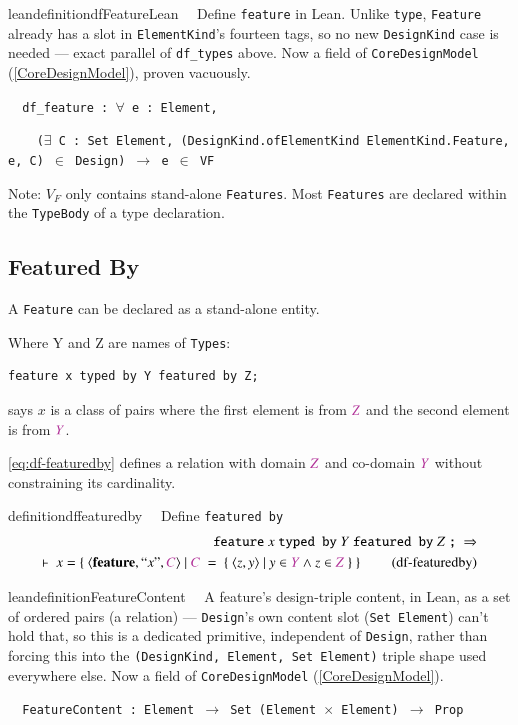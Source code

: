 \begin{restatable}{leandefinition}{dfFeatureLean}~~ Define \texttt{feature} in Lean. Unlike
\texttt{type}, \texttt{Feature} already has a slot in \texttt{ElementKind}'s fourteen tags, so no new
\texttt{DesignKind} case is needed --- exact parallel of \texttt{df\_types} above. Now a field of
\texttt{CoreDesignModel} (\ref{CoreDesignModel}), proven vacuously.

\texttt{~~df\_feature : $\forall$ e : Element,}

\texttt{~~~~($\exists$ C : Set Element, (DesignKind.ofElementKind ElementKind.Feature, e, C) $\in$ Design) $\to$ e $\in$ VF}
\label{df_feature}
\end{restatable}

Note:  $V_F$ only contains stand-alone  \texttt{Features}.  Most  \texttt{Features} are declared within the \texttt{TypeBody} of a type declaration.

\subsection{Featured By}  

\pn A \texttt{Feature} can be declared as a stand-alone entity.

\pn Where Y and Z are names of \texttt{Types}:
\begin{lstlisting}
feature x typed by Y featured by Z;
\end{lstlisting}
says $x$ is a class of pairs where the first element is from $\mc{Z}$ and the second element is from $\mc{Y}$.

\ref{eq:df-featuredby} defines a relation with domain $\mc{Z}$ and co-domain $\mc{Y}$ without constraining its cardinality.


\begin{restatable}{definition}{dffeaturedby}~~   Define \texttt{featured by}
\begin{align}
\texttt{feature}~x~\texttt{typed by}~ Y ~\texttt{featured by}~ Z~\texttt{;}~\Rightarrow  \notag \\
\vdash ~x=\{~\langle \textbf{feature},``x",\mc{C}\rangle~\vert~\mc{C}~=~\{~\langle z,y\rangle~\vert~y \in \mc{Y} \wedge z \in \mc{Z}~\}~\}~\label{eq:df-featuredby}\tag{df-featuredby}
\end{align}
\end{restatable}

\begin{restatable}{leandefinition}{FeatureContent}~~ A feature's design-triple content, in
Lean, as a set of ordered pairs (a relation) --- \texttt{Design}'s own content slot (\texttt{Set Element})
can't hold that, so this is a dedicated primitive, independent of \texttt{Design}, rather than forcing this
into the \texttt{(DesignKind, Element, Set Element)} triple shape used everywhere else. Now a field of
\texttt{CoreDesignModel} (\ref{CoreDesignModel}).

\texttt{~~FeatureContent : Element $\to$ Set (Element $\times$ Element) $\to$ Prop}
\label{FeatureContent}
\end{restatable}

